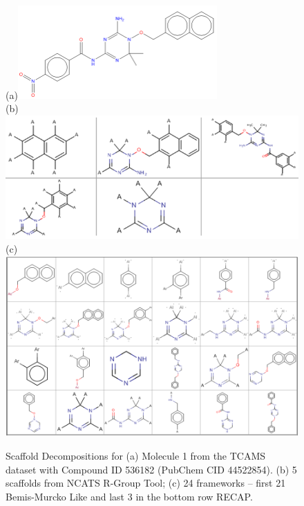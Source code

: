 \documentclass[journal=jacsat,manuscript=article]{achemso}
\begin{document}
\begin{figure}

(a)\includegraphics[width=3in]{fig/tcam1_mol.png}\\
\vspace{0.1in}
(b)\includegraphics[width=5in]{fig/tcam1_RGscaf.png}\\
\vspace{0.1in}
(c)\includegraphics[width=5in]{fig/tcam1_GSKframes.png}
\caption{Scaffold Decompositions for (a) Molecule 1 from the TCAMS dataset with Compound ID 536182 (PubChem CID 44522854). (b) 5 scaffolds from NCATS R-Group Tool; (c) 24 frameworks -- first 21 Bemis-Murcko Like and last 3 in the bottom row RECAP.}
\label{fig:scafmethod}
\end{figure}
\end{document}
